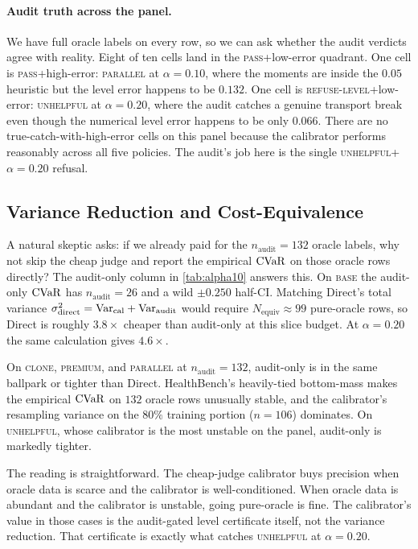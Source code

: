 \paragraph{Audit truth across the panel.}
We have full oracle labels on every row, so we can ask whether the
audit verdicts agree with reality. Eight of
ten cells land in the \textsc{pass}+low-error quadrant. One cell is
\textsc{pass}+high-error: \textsc{parallel} at $\alpha = 0.10$, where
the moments are inside the $0.05$ heuristic but the level error
happens to be $0.132$. One cell is \textsc{refuse-level}+low-error:
\textsc{unhelpful} at $\alpha = 0.20$, where the audit catches a
genuine transport break even though the numerical level error happens
to be only $0.066$. There are no true-catch-with-high-error cells on
this panel because the calibrator performs reasonably across all five
policies. The audit's job here is the single
\textsc{unhelpful}+$\alpha=0.20$ refusal.

\subsection{Variance Reduction and Cost-Equivalence}
\label{sec:results-cost}

A natural skeptic asks: if we already paid for the
$n_{\mathrm{audit}} = 132$ oracle labels, why not skip the cheap
judge and report the empirical $\mathrm{CVaR}$ on those oracle rows directly?
The audit-only column in \cref{tab:alpha10} answers this. On
\textsc{base} the audit-only $\mathrm{CVaR}$ has $n_{\mathrm{audit}} = 26$ and
a wild $\pm 0.250$ half-CI. Matching Direct's total variance
$\sigma^2_{\mathrm{direct}} = \mathrm{Var}_{\mathrm{cal}} +
\mathrm{Var}_{\mathrm{audit}}$ would require $N_{\mathrm{equiv}} \approx 99$
pure-oracle rows, so Direct is roughly $\mathbf{3.8\times}$ cheaper
than audit-only at this slice budget. At $\alpha = 0.20$ the same
calculation gives $\mathbf{4.6\times}$.

On \textsc{clone}, \textsc{premium}, and \textsc{parallel} at
$n_{\mathrm{audit}} = 132$, audit-only is in the same ballpark or
tighter than Direct. HealthBench's heavily-tied bottom-mass makes the
empirical $\mathrm{CVaR}$ on $132$ oracle rows unusually stable, and the
calibrator's resampling variance on the $80\%$ training portion
($n = 106$) dominates. On \textsc{unhelpful}, whose calibrator is the
most unstable on the panel, audit-only is markedly tighter.

The reading is straightforward. The cheap-judge calibrator buys
precision when oracle data is scarce and the calibrator is
well-conditioned. When oracle data is abundant and the calibrator is
unstable, going pure-oracle is fine. The calibrator's value in those
cases is the audit-gated level certificate itself, not the variance
reduction. That certificate is exactly what catches \textsc{unhelpful}
at $\alpha = 0.20$.

